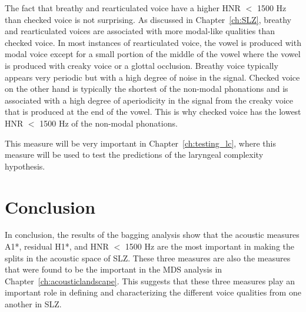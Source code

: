 The fact that breathy and rearticulated voice have a higher HNR $<$ 1500 Hz than checked voice is not surprising. As discussed in Chapter~\ref{ch:SLZ}, breathy and rearticulated voices are associated with more modal-like qualities than checked voice. In most instances of rearticulated voice, the vowel is produced with modal voice except for a small portion of the middle of the vowel where the vowel is produced with creaky voice or a glottal occlusion. Breathy voice typically appears  very periodic but with a high degree of noise in the signal. Checked voice on the other hand is typically the shortest of the non-modal phonations and is associated with a high degree of aperiodicity in the signal from the creaky voice that is produced at the end of the vowel. This is why checked voice has the lowest HNR $<$ 1500 Hz of the non-modal phonations.

This measure will be very important in Chapter~\ref{ch:testing_lc}, where this measure will be used to test the predictions of the laryngeal complexity hypothesis.

\section{Conclusion} \label{sec:bagging_conclusion}

In conclusion, the results of the bagging analysis show that the acoustic measures A1*, residual H1*, and HNR $<$ 1500 Hz are the most important in making the splits in the acoustic space of SLZ. These three measures are also the measures that were found to be the important in the MDS analysis in Chapter~\ref{ch:acousticlandscape}. This suggests that these three measures play an important role in defining and characterizing the different voice qualities from one another in SLZ. 

